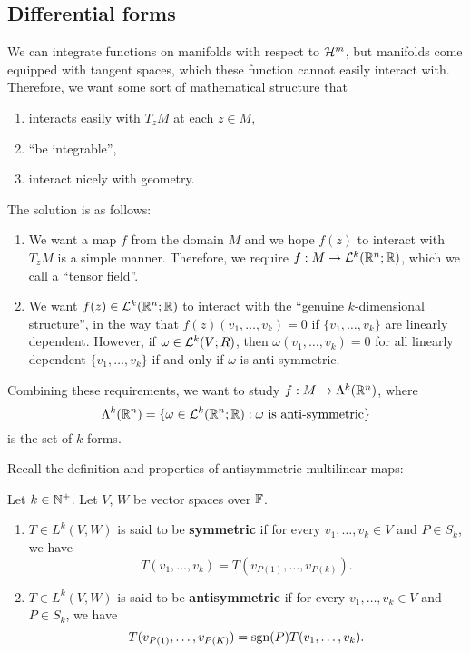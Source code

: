 \documentclass[a4paper]{article}
\begin{document}
\subsection{Differential forms}
We can integrate functions on manifolds with respect to 
$\mathcal{H}^m$, but manifolds come equipped with tangent spaces, 
which these function cannot easily interact with. Therefore, 
we want some sort of mathematical structure that 
\begin{enumerate}
\item interacts easily with $T_z M$ at each $z \in M$, 
\item ``be integrable'',
\item interact nicely with geometry.
\end{enumerate}

The solution is as follows:
\begin{enumerate}
\item We want a map $f$ from the domain $M$ and we hope
$f(z)$ to interact with $T_z M$ is a simple manner.
Therefore, we require $f : M \to \mathcal{L}^k(\mathbb{R}^n ; \mathbb{R})$, which we call
a ``tensor field''.

\item We want $f(z) \in \mathcal{L}^k(\mathbb{R}^n ; \mathbb{R})$ to interact
with the ``genuine $k$-dimensional structure'', in the way
that $f(z) (v_1, \dots, v_k) = 0$ if $\{v_1, \dots, v_k\}$
are linearly dependent. However, if
$\omega \in \mathcal{L}^k (V ; R)$, then $\omega (v_1, \dots, v_k) = 0$
for all linearly dependent $\{v_1, \dots, v_k\}$
if and only if $\omega$ is anti-symmetric.
\end{enumerate}
Combining these requirements, we want to
study $f : M \to \Lambda^k (\mathbb{R}^n)$, where
\[
\Lambda^k (\mathbb{R}^n)
= \{\omega \in \mathcal{L}^k(\mathbb{R}^n ; \mathbb{R}) : \omega \text{ is
anti-symmetric}\}
\]
is the set of $k$-forms.

Recall the definition and properties 
of antisymmetric multilinear maps:

\begin{defi}
Let $k \in \mathbb{N}^+$. Let $V$, $W$ be vector spaces over $\mathbb{F}$.
\begin{enumerate}
\item $T \in L^k(V, W)$ is said to be \textbf{symmetric}
if for every $v_1 , \dots, v_k \in V$ and $P \in S_k$, we
have 
\[
T(v_1, \dots, v_k) = T(v_{P(1)}, \dots, v_{P(k)}).
\]
\item $T \in L^k(V, W)$ is said to be \textbf{antisymmetric}
if for every $v_1, \dots, v_k \in V$ and $P \in S_k$, we have 
\[
T(v_{P(1)}, \dots, v_{P(K)}) = \operatorname{sgn} (P) T(v_1, \dots, v_k).
\] 
\end{enumerate}
\end{defi}
\end{document}
